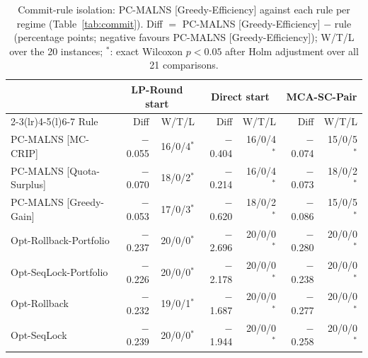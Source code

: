 \begin{table}[pos=!htb]
\centering
\caption{Commit-rule isolation: PC-MALNS [Greedy-Efficiency] against each rule per regime (Table~\ref{tab:commit}). Diff $=$ PC-MALNS [Greedy-Efficiency] $-$ rule (percentage points; negative favours PC-MALNS [Greedy-Efficiency]); W/T/L over the 20 instances; $^{*}$: exact Wilcoxon $p < 0.05$ after Holm adjustment over all 21 comparisons.}
\label{tab:commit_tests}
\footnotesize
\begin{tabular}{@{}lrrrrrr@{}}
\toprule
 & \multicolumn{2}{c}{LP-Round start} & \multicolumn{2}{c}{Direct start} & \multicolumn{2}{c}{MCA-SC-Pair} \\
\cmidrule(lr){2-3}\cmidrule(lr){4-5}\cmidrule(l){6-7}
Rule & Diff & W/T/L & Diff & W/T/L & Diff & W/T/L \\
\midrule
PC-MALNS [MC-CRIP] & $-$0.055 & 16/0/4$^{*}$ & $-$0.404 & 16/0/4$^{*}$ & $-$0.074 & 15/0/5$^{*}$ \\
PC-MALNS [Quota-Surplus] & $-$0.070 & 18/0/2$^{*}$ & $-$0.214 & 16/0/4$^{*}$ & $-$0.073 & 18/0/2$^{*}$ \\
PC-MALNS [Greedy-Gain] & $-$0.053 & 17/0/3$^{*}$ & $-$0.620 & 18/0/2$^{*}$ & $-$0.086 & 15/0/5$^{*}$ \\
Opt-Rollback-Portfolio & $-$0.237 & 20/0/0$^{*}$ & $-$2.696 & 20/0/0$^{*}$ & $-$0.280 & 20/0/0$^{*}$ \\
Opt-SeqLock-Portfolio & $-$0.226 & 20/0/0$^{*}$ & $-$2.178 & 20/0/0$^{*}$ & $-$0.238 & 20/0/0$^{*}$ \\
Opt-Rollback & $-$0.232 & 19/0/1$^{*}$ & $-$1.687 & 20/0/0$^{*}$ & $-$0.277 & 20/0/0$^{*}$ \\
Opt-SeqLock & $-$0.239 & 20/0/0$^{*}$ & $-$1.944 & 20/0/0$^{*}$ & $-$0.258 & 20/0/0$^{*}$ \\
\bottomrule
\end{tabular}
\end{table}
